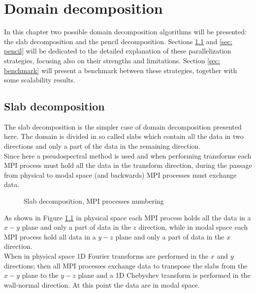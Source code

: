 \chapter{Domain decomposition}
\label{chap: dom_decomp}
In this chapter two possible domain decomposition algorithms will be presented: the slab decomposition and the pencil decomposition. Sections \ref{sec: slab} and \ref{sec: pencil} will be dedicated to the detailed explanation of these parallelization strategies, focusing also on their strengths and limitations. Section \ref{sec: benchmark} will present a benchmark between these strategies, together with some scalability results.

\section{Slab decomposition}
\label{sec: slab}
The slab decomposition is the simpler case of domain decomposition presented here. The domain is divided in so called slabs which contain all the data in two directions and only a part of the data in the remaining direction.\\
Since here a pseudospectral method is used and when performing transforms each MPI process must hold all the data in the transform direction, during the passage from physical to modal space (and backwards) MPI processes must exchange data. 
\begin{figure}[h!]
\centering
\begin{subfigure}{0.45\textwidth}

\end{subfigure}%
\hspace{0.5cm}
\begin{subfigure}{0.45\textwidth}

\end{subfigure}
\caption{Slab decomposition, MPI processes numbering}
\label{fig: slab}
\end{figure}
As shown in Figure \ref{fig: slab} in physical space each MPI process holds all the data in a $x-y$ plane and only a part of data in the $z$ direction, while in modal space each MPI process hold all data in a $y-z$ plane and only a part of data in the $x$ direction.\\
When in physical space 1D Fourier transforms are performed in the $x$ and $y$ directions; then all MPI processes exchange data to transpose the slabs from the $x-y$ plane to the $y-z$ plane and a 1D Chebyshev transform is performed in the wall-normal direction. At this point the data are in modal space.\\
